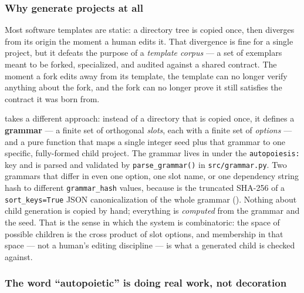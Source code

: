 \documentclass[
]{article}
\begin{document}
\subsubsection{Why generate projects at
all}\label{why-generate-projects-at-all}

Most software templates are static: a directory tree is copied once,
then diverges from its origin the moment a human edits it. That
divergence is fine for a single project, but it defeats the purpose of a
\emph{template corpus} --- a set of exemplars meant to be forked,
specialized, and audited against a shared contract. The moment a fork
edits away from its template, the template can no longer verify anything
about the fork, and the fork can no longer prove it still satisfies the
contract it was born from.

 takes a different approach: instead of a
directory that is copied once, it defines a \textbf{grammar} --- a
finite set of orthogonal \emph{slots}, each with a finite set of
\emph{options} --- and a pure function that maps a single integer seed
plus that grammar to one specific, fully-formed child project. The
grammar lives in  under the
\texttt{autopoiesis:} key and is parsed and validated by
\texttt{parse\_grammar()} in \texttt{src/grammar.py}. Two grammars that
differ in even one option, one slot name, or one dependency string hash
to different \texttt{grammar\_hash} values, because
 is the truncated SHA-256 of a
\texttt{sort\_keys=True} JSON canonicalization of the whole grammar
(). Nothing about child generation is copied
by hand; everything is \emph{computed} from the grammar and the seed.
That is the sense in which the system is combinatoric: the space of
possible children is the cross product of slot options, and membership
in that space --- not a human's editing discipline --- is what a
generated child is checked against.

\subsubsection{The word ``autopoietic'' is doing real work, not
decoration}\label{the-word-autopoietic-is-doing-real-work-not-decoration}
\end{document}
